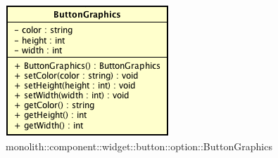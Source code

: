 \label{monolith::component::widget::button::option::ButtonGraphics}
\begin{figure}[H]
	\centering
	\includegraphics[scale=0.5]{Sezioni/SottosezioniST/img/ButtonGraphics.png}
	\caption{monolith::component::widget::button::option::ButtonGraphics}
\end{figure}

